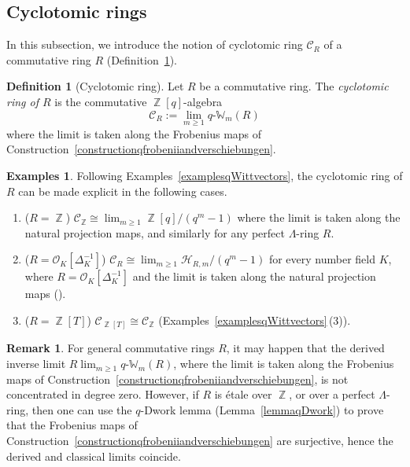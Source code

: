\documentclass[10pt,twoside]{scrarticle}
\newlength{\mar} \setlength{\mar}{1cm}%
\newlength{\len}
\theoremstyle{definition}
\newtheorem{remark}[theorem]{Remark}
\newtheorem{examples}[theorem]{Examples}
\newtheorem{definition}[theorem]{Definition}
\DeclareMathOperator{\Z}{\mathbb{Z}}
\newcommand{\nbrrg}{\mathcal{O}_K[\Delta_K^{-1}]}
\newcommand{\CR}{\mathcal{C}_{R}}
\newcommand{\qWm}{q\text{-}\mathbb{W}_m}
\renewcommand{\ge}{\geqslant}
\numberwithin{equation}{theorem}
\begin{document}
\subsection{Cyclotomic rings}\label{subsectioncyclotomicrings}

In this subsection, we introduce the notion of cyclotomic ring $\mathcal{C}_R$ of a commutative ring $R$ (Definition~\ref{definitioncyclotomicring}).

\begin{definition}[Cyclotomic ring]\label{definitioncyclotomicring}
    Let $R$ be a commutative ring. The \emph{cyclotomic ring of $R$} is the commutative $\Z[q]$-algebra
    $$\CR := \lim_{m \ge 1} \qWm(R)$$
    where the limit is taken along the Frobenius maps of Construction~\ref{constructionqfrobeniiandverschiebungen}.
\end{definition}

\begin{examples}\label{examplescyclotomicring}
    Following Examples~\ref{examplesqWittvectors}, the cyclotomic ring of $R$ can be made explicit in the following cases.
    \begin{enumerate}
        \item ($R=\Z$) $\mathcal{C}_{\Z} \cong \lim_{m \ge 1} \Z[q]/(q^m-1)$ where the limit is taken along the natural projection maps, and similarly for any perfect $\Lambda$-ring $R$.
        \item ($R=\nbrrg$) $\CR \cong \lim_{m \ge 1} \mathcal{H}_{R,m}/(q^m-1)$ for every number field $K$, where $R=\nbrrg$ and the limit is taken along the natural projection maps (\cite[Remark~2.9]{wagner_q-hodge_2025}).
        \item ($R=\Z[T]$) $\mathcal{C}_{\Z[T]} \cong \mathcal{C}_{\Z}$ (Examples~\ref{examplesqWittvectors}\,(3)). 
    \end{enumerate}
\end{examples}

\begin{remark}
    For general commutative rings $R$, it may happen that the derived inverse limit $R\!\lim_{m \ge 1} \qWm(R)$, where the limit is taken along the Frobenius maps of Construction~\ref{constructionqfrobeniiandverschiebungen}, is not concentrated in degree zero. However, if $R$ is étale over $\Z$, or over a perfect $\Lambda$-ring, then one can use the $q$-Dwork lemma (Lemma~\ref{lemmaqDwork}) to prove that the Frobenius maps of Construction~\ref{constructionqfrobeniiandverschiebungen} are surjective, hence the derived and classical limits coincide.
\end{remark}
\end{document}
